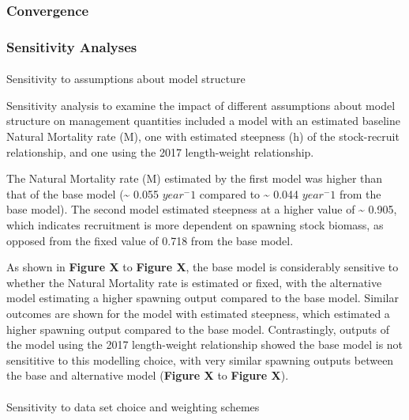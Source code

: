 \documentclass[
]{scrartcl}
\makeatletter
\let\oldparagraph\paragraph
\renewcommand{\paragraph}{
    \@ifstar
      \xxxParagraphStar
      \xxxParagraphNoStar
  }
\newcommand{\xxxParagraphStar}[1]{\oldparagraph*{#1}\mbox{}}
\newcommand{\xxxParagraphNoStar}[1]{\oldparagraph{#1}\mbox{}}
\makeatother
\begin{document}
\subsubsection{Convergence}\label{convergence}

\subsubsection{Sensitivity Analyses}\label{sensitivity-analyses}

\paragraph{Sensitivity to assumptions about model
structure}\label{sensitivity-to-assumptions-about-model-structure}

Sensitivity analysis to examine the impact of different assumptions
about model structure on management quantities included a model with an
estimated baseline Natural Mortality rate (M), one with estimated
steepness (h) of the stock-recruit relationship, and one using the 2017
length-weight relationship.

The Natural Mortality rate (M) estimated by the first model was higher
than that of the base model (\textasciitilde{} 0.055 \(year^-1\)
compared to \textasciitilde{} 0.044 \(year^-1\) from the base model).
The second model estimated steepness at a higher value of
\textasciitilde{} 0.905, which indicates recruitment is more dependent
on spawning stock biomass, as opposed from the fixed value of 0.718 from
the base model.

As shown in \textbf{Figure X} to \textbf{Figure X}, the base model is
considerably sensitive to whether the Natural Mortality rate is
estimated or fixed, with the alternative model estimating a higher
spawning output compared to the base model. Similar outcomes are shown
for the model with estimated steepness, which estimated a higher
spawning output compared to the base model. Contrastingly, outputs of
the model using the 2017 length-weight relationship showed the base
model is not sensititive to this modelling choice, with very similar
spawning outputs between the base and alternative model (\textbf{Figure
X} to \textbf{Figure X}).

\paragraph{Sensitivity to data set choice and weighting
schemes}\label{sensitivity-to-data-set-choice-and-weighting-schemes}
\end{document}
